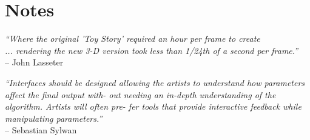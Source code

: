 \section*{Notes}
\label{notes}

\begin{flushright}
\textit{``Where the original 'Toy Story' required an hour per frame to create\\ ... rendering the new 3-D version took less than 1/24th of a second per frame.''}\\
-- John Lasseter \citep[CCO Pixar, cited in:][]{Smith2009}
\end{flushright}

\begin{flushright}
\textit{``Interfaces should be designed allowing the artists to understand how parameters affect the final output with- out needing an in-depth understanding of the algorithm. Artists will often pre- fer tools that provide interactive feedback while manipulating parameters.''}\\
-- Sebastian Sylwan \citep[CCO Weta Digital][p.197]{Sylwan2011}
\end{flushright}